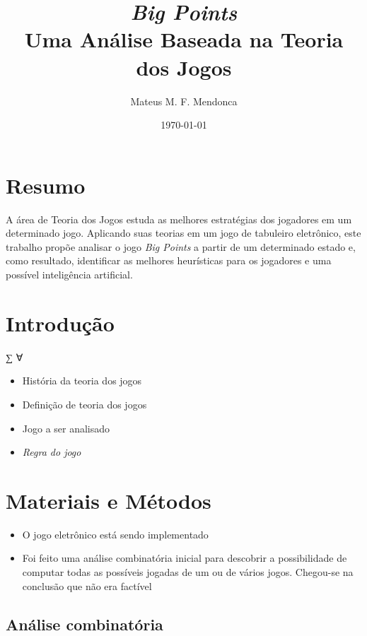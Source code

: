 \documentclass[dvipdfm, a4paper, 11pt]{article}
\begin{document}
\title{\textit{Big Points}\\Uma Análise Baseada na Teoria dos Jogos}
\author{Mateus M. F. Mendonca}
\date{\today}
\maketitle
\section{Resumo}\label{resumo}

A área de Teoria dos Jogos estuda as melhores estratégias dos jogadores
em um determinado jogo. Aplicando suas teorias em um jogo de tabuleiro
eletrônico, este trabalho propõe analisar o jogo \emph{Big Points} a
partir de um determinado estado e, como resultado, identificar as
melhores heurísticas para os jogadores e uma possível inteligência
artificial.

\section{Introdução}\label{introduuxe7uxe3o}

∑ ∀

\begin{itemize}
\itemsep1pt\parskip0pt
\item
  História da teoria dos jogos
\item
  Definição de teoria dos jogos
\item
  Jogo a ser analisado
\item
  \emph{Regra do jogo}
\end{itemize}

\section{Materiais e Métodos}\label{materiais-e-muxe9todos}

\begin{itemize}
\itemsep1pt\parskip0pt
\item
  O jogo eletrônico está sendo implementado
\item
  Foi feito uma análise combinatória inicial para descobrir a
  possibilidade de computar todas as possíveis jogadas de um ou de
  vários jogos. Chegou-se na conclusão que não era factível
\end{itemize}

\subsection{Análise combinatória}\label{anuxe1lise-combinatuxf3ria}
\end{document}
